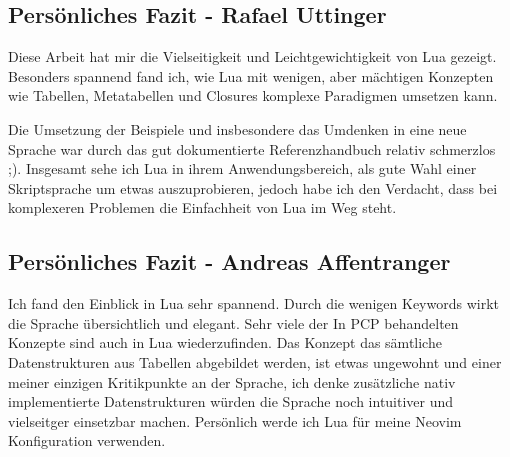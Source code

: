 \documentclass[11pt,a4paper]{article}
\begin{document}
\subsection*{Persönliches Fazit - Rafael Uttinger}
Diese Arbeit hat mir die Vielseitigkeit und Leichtgewichtigkeit von Lua gezeigt.
Besonders spannend fand ich, wie Lua mit wenigen, aber mächtigen Konzepten wie Tabellen, Metatabellen und Closures komplexe Paradigmen umsetzen kann.

Die Umsetzung der Beispiele und insbesondere das Umdenken in eine neue Sprache war durch das gut dokumentierte Referenzhandbuch relativ schmerzlos ;).
Insgesamt sehe ich Lua in ihrem Anwendungsbereich, als gute Wahl einer Skriptsprache um etwas auszuprobieren, jedoch habe ich den Verdacht,
dass bei komplexeren Problemen die Einfachheit von Lua im Weg steht.

\subsection{Persönliches Fazit - Andreas Affentranger}
Ich fand den Einblick in Lua sehr spannend. Durch die wenigen Keywords wirkt die Sprache übersichtlich und elegant. Sehr viele der In PCP behandelten Konzepte sind auch in Lua
wiederzufinden. Das Konzept das sämtliche Datenstrukturen aus Tabellen abgebildet werden, ist etwas ungewohnt und einer meiner einzigen Kritikpunkte an der Sprache, ich denke zusätzliche nativ implementierte Datenstrukturen
würden die Sprache noch intuitiver und vielseitger einsetzbar machen. Persönlich werde ich Lua für meine Neovim Konfiguration verwenden.
\end{document}
